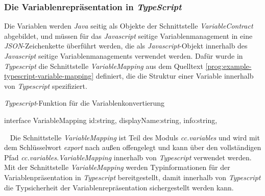 \subsubsection{Die Variablenrepräsentation in \emph{TypeScript}}
Die Variablen werden \emph{Java} seitig als Objekte der Schnittstelle \emph{VariableContract} abgebildet, und müssen für das \emph{Javascript} seitige Variablenmanagement in eine \emph{JSON}-Zeichenkette überführt werden, die als \emph{Javascript}-Objekt innerhalb des \emph{Javascript} seitige Variablenmanagements verwendet werden. Dafür wurde in \emph{Typescript} die Schnittstelle \emph{VariableMapping} aus dem Quelltext \ref{prog:example-typescript-variable-mapping} definiert, die die Struktur einer Variable innerhalb von \emph{Typescript} spezifiziert.
\begin{program}[h]
\caption{\emph{Typescript}-Funktion für die Variablenkonvertierung}
\label{prog:example-typescript-variable-mapping}
\begin{JsCode}[numbers=none]
interface VariableMapping {    
	id:string,       
	displayName:string,        
	info:string,
}
\end{JsCode}
\end{program}
\ \newline
Die Schnittstelle \emph{VariableMapping} ist Teil des Moduls \emph{cc.variables} und wird mit dem Schlüsselwort \emph{export} nach außen offengelegt und kann über den vollständigen Pfad \emph{cc.variables.VariableMapping} innerhalb von \emph{Typescript} verwendet werden. Mit der Schnittstelle \emph{VariableMapping} werden Typinformationen für der Variablenpräsentation in \emph{Typescript} bereitgestellt, damit innerhalb von \emph{Typescript} die Typsicherheit der Variablenrepräsentation sichergestellt werden kann.

